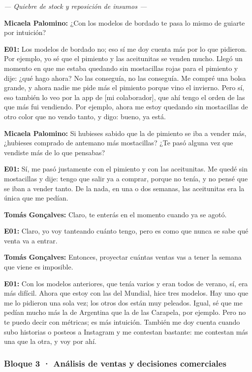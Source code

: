 \noindent\textit{--- Quiebre de stock y reposición de insumos ---}

\noindent\textbf{Micaela Palomino:} ¿Con los modelos de bordado te pasa lo mismo de guiarte por intuición?

\noindent\textbf{E01:} Los modelos de bordado no; eso sí me doy cuenta más por lo que pidieron. Por ejemplo, yo sé que el pimiento y las aceitunitas se venden mucho. Llegó un momento en que me estaba quedando sin mostacillas rojas para el pimiento y dije: ¿qué hago ahora? No las conseguía, no las conseguía. Me compré una bolsa grande, y ahora nadie me pide más el pimiento porque vino el invierno. Pero sí, eso también lo veo por la app de [mi colaborador], que ahí tengo el orden de las que más fui vendiendo. Por ejemplo, ahora me estoy quedando sin mostacillas de otro color que no vendo tanto, y digo: bueno, ya está.

\noindent\textbf{Micaela Palomino:} Si hubieses sabido que la de pimiento se iba a vender más, ¿hubieses comprado de antemano más mostacillas? ¿Te pasó alguna vez que vendiste más de lo que pensabas?

\noindent\textbf{E01:} Sí, me pasó justamente con el pimiento y con las aceitunitas. Me quedé sin mostacillas y dije: tengo que salir ya a comprar, porque no tenía, y no pensé que se iban a vender tanto. De la nada, en una o dos semanas, las aceitunitas era la única que me pedían.

\noindent\textbf{Tomás Gonçalves:} Claro, te enterás en el momento cuando ya se agotó.

\noindent\textbf{E01:} Claro, yo voy tanteando cuánto tengo, pero es como que nunca se sabe qué venta va a entrar.

\noindent\textbf{Tomás Gonçalves:} Entonces, proyectar cuántas ventas vas a tener la semana que viene es imposible.

\noindent\textbf{E01:} Con los modelos anteriores, que tenía varios y eran todos de verano, sí, era más difícil. Ahora que estoy con las del Mundial, hice tres modelos. Hay uno que me lo pidieron una sola vez; los otros dos están muy peleados. Igual, sé que me pedían mucho más la de Argentina que la de las Carapela, por ejemplo. Pero no te puedo decir con métricas; es más intuición. También me doy cuenta cuando subo historias o posteos a Instagram y me contestan bastante: me contestan más una que la otra, y voy por ahí.

\subsubsection*{Bloque 3 · Análisis de ventas y decisiones comerciales}

